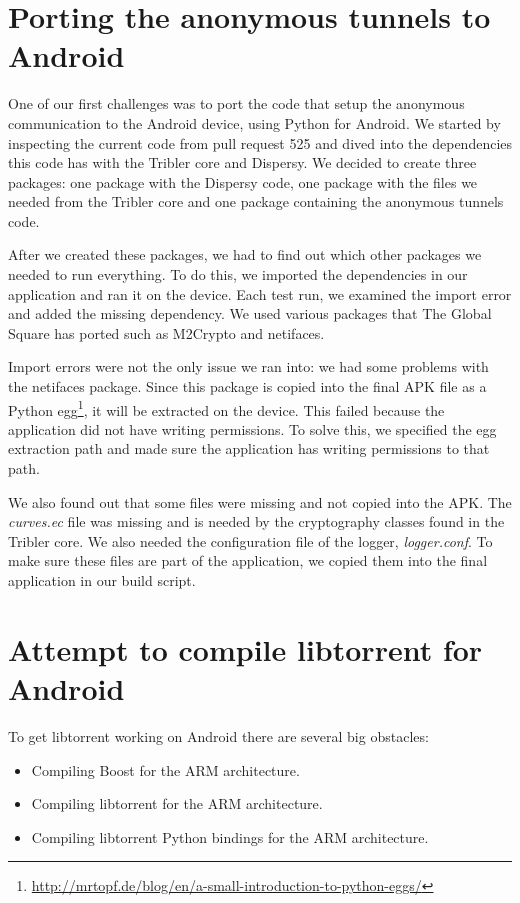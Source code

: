 	\section{Porting the anonymous tunnels to Android}
		One of our first challenges was to port the code that setup the anonymous communication to the Android device, using Python for Android. We started by inspecting the current code from pull request 525 and dived into the dependencies this code has with the Tribler core and Dispersy. We decided to create three packages: one package with the Dispersy code, one package with the files we needed from the Tribler core and one package containing the anonymous tunnels code.
		
		After we created these packages, we had to find out which other packages we needed to run everything. To do this, we imported the dependencies in our application and ran it on the device. Each test run, we examined the import error and added the missing dependency. We used various packages that The Global Square has ported such as M2Crypto and netifaces.
		
		Import errors were not the only issue we ran into: we had some problems with the netifaces package. Since this package is copied into the final APK file as a Python egg\footnote{\url{http://mrtopf.de/blog/en/a-small-introduction-to-python-eggs/}}, it will be extracted on the device. This failed because the application did not have writing permissions. To solve this, we specified the egg extraction path and made sure the application has writing permissions to that path.
		
		We also found out that some files were missing and not copied into the APK. The \emph{curves.ec} file was missing and is needed by the cryptography classes found in the Tribler core. We also needed the configuration file of the logger, \emph{logger.conf}. To make sure these files are part of the application, we copied them into the final application in our build script.
		
	\section{Attempt to compile libtorrent for Android}
		To get libtorrent working on Android there are several big obstacles:
		\begin{itemize}
			\item Compiling Boost for the ARM architecture.
			\item Compiling libtorrent for the ARM architecture.
			\item Compiling libtorrent Python bindings for the ARM architecture.
		\end{itemize}
		
